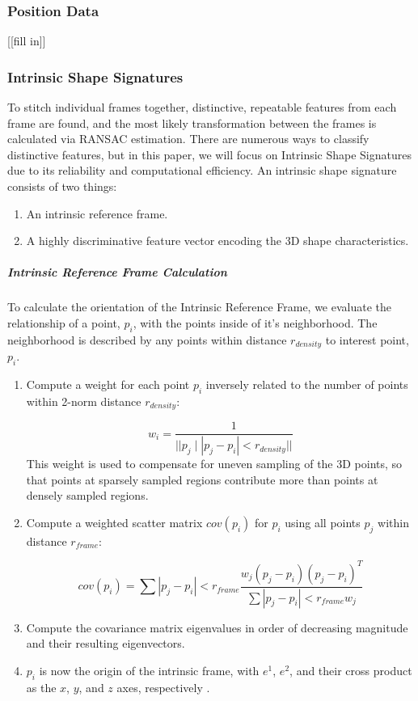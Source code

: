 \documentclass[12pt]{drexelthesis}
\let\Oldsubsubsection\subsubsection
\renewcommand{\subsubsection}{\FloatBarrier\Oldsubsubsection}
\begin{document}
\subsubsection{Position Data}
[[fill in]]
\subsubsection{Intrinsic Shape Signatures}
To stitch individual frames together, distinctive, repeatable features from each frame are found, and the most likely transformation between the frames is calculated via RANSAC estimation. There are numerous ways to classify distinctive features, but in this paper, we will focus on Intrinsic Shape Signatures due to its reliability and computational efficiency.
An intrinsic shape signature consists of two things:

\begin{enumerate}
	\item An intrinsic reference frame.
	\item A highly discriminative feature vector encoding the 3D shape characteristics.
\end{enumerate}

\subparagraph{Intrinsic Reference Frame Calculation}
To calculate the orientation of the Intrinsic Reference Frame, we evaluate the relationship of a point, $p_{i}$, with the points inside of it's neighborhood. The neighborhood is described by any points within distance $r_{density}$ to interest point, $p_{i}$.

\begin{enumerate}
	\item Compute a weight for each point $p_{i}$ inversely related to the number of points within 2-norm distance $r_{density}$:
	
		\begin{equation}
		w_{i}=  \frac{1}{||p_{j} \mid |p_{j}-p_{i}| < r_{density}||}
		\end{equation}
		This weight is used to compensate for uneven sampling of the 3D points, so that points at sparsely sampled regions contribute more than points at densely sampled regions. 

	\item Compute a weighted scatter matrix $cov(p_{i})$ for $p_{i}$ using all points $p_{j}$ within distance $r_{frame}$:
	
		\begin{equation}
		cov(p_{i})= \sum{|p_{j}-p_{i}| < r_{frame}}\frac{w_{j}(p_{j}-p_{i})(p_{j}-p_{i})^{T}}{ \sum{|p_{j}-p_{i}| < r_{frame}}w_{j}}
		\end{equation}
		
	\item Compute the covariance matrix eigenvalues in order of decreasing magnitude and their resulting eigenvectors.
	\item $p_{i}$ is now the origin of the intrinsic frame, with $e^{1}$, $e^{2}$, and their cross product as the $x$, $y$, and $z$ axes, respectively \cite{RN60}.
\end{enumerate}
\end{document}
